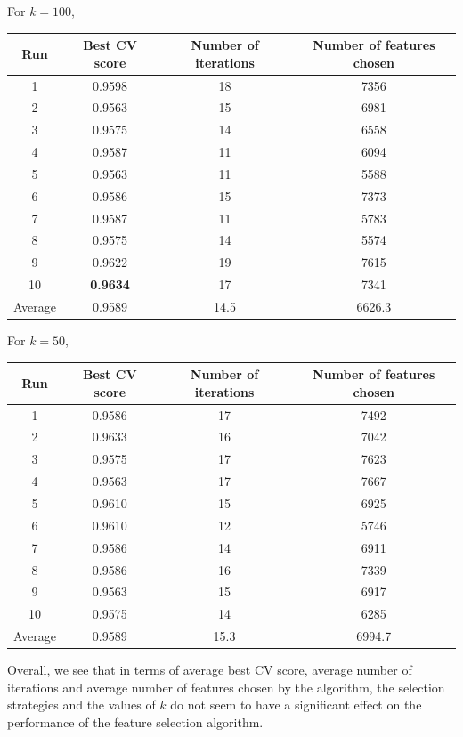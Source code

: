 \documentclass[12pt, twoside, a4paper]{report}
\begin{document}
For $k=100$,
\begin{center}
    \begin{tabular}{| c | c | c | c | } \hline
    Run & Best CV score & Number of iterations & Number of features chosen \\ \hline \hline
    1 & 0.9598 & 18 & 7356 \\ \hline
	2 & 0.9563  & 15 & 6981 \\ \hline
	3 & 0.9575 & 14 & 6558 \\ \hline
	4 & 0.9587 & 11 & 6094 \\ \hline
	5 & 0.9563 & 11 & 5588 \\ \hline
	6 & 0.9586 & 15 & 7373 \\ \hline
	7 & 0.9587 & 11 & 5783 \\ \hline
	8 & 0.9575 & 14 & 5574 \\ \hline
	9 & 0.9622 & 19 & 7615 \\ \hline
	10 & \textbf{0.9634} & 17 & 7341 \\ \hline
	Average & 0.9589 & 14.5 & 6626.3 \\ \hline
    \end{tabular}
\end{center}


For $k=50$,
\begin{center}
    \begin{tabular}{| c | c | c | c | } \hline
    Run & Best CV score & Number of iterations & Number of features chosen \\ \hline \hline
    1 & 0.9586 & 17 & 7492 \\ \hline
	2 & 0.9633 & 16 & 7042 \\ \hline
	3 & 0.9575 & 17 & 7623 \\ \hline
	4 & 0.9563 & 17 & 7667 \\ \hline
	5 & 0.9610 & 15 & 6925 \\ \hline
	6 & 0.9610 & 12 & 5746 \\ \hline
	7 & 0.9586 & 14 & 6911 \\ \hline
	8 & 0.9586 & 16 & 7339 \\ \hline
	9 & 0.9563 & 15 & 6917 \\ \hline
	10 & 0.9575 & 14 & 6285 \\ \hline
	Average & 0.9589 & 15.3 & 6994.7 \\ \hline
    \end{tabular}
\end{center}

Overall, we see that in terms of average best CV score, average number of iterations and average number of features chosen by the algorithm, the selection strategies and the values of $k$ do not seem to have a significant effect on the performance of the feature selection algorithm.
\end{document}
